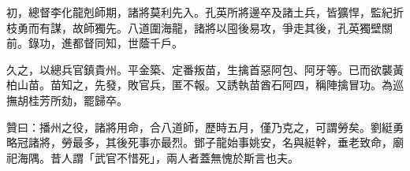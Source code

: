 \begin{pinyinscope}
初，總督李化龍剋師期，諸將莫利先入。孔英所將邊卒及諸土兵，皆獷悍，監紀折枝勇而有謀，故師獨先。八道圍海龍，諸將以囤後易攻，爭走其後，孔英獨壁關前。錄功，進都督同知，世蔭千戶。

久之，以總兵官鎮貴州。平金築、定番叛苗，生擒首惡阿包、阿牙等。已而欲襲黃柏山苗。苗知之，先發，敗官兵，匿不報。又誘執苗酋石阿四，稱陣擒冒功。為巡撫胡桂芳所劾，罷歸卒。

贊曰：播州之役，諸將用命，合八道師，歷時五月，僅乃克之，可謂勞矣。劉綎勇略冠諸將，勞最多，其後死事亦最烈。鄧子龍始事姚安，名與綎幹，垂老致命，廟祀海隅。昔人謂「武官不惜死」，兩人者蓋無愧於斯言也夫。


\end{pinyinscope}